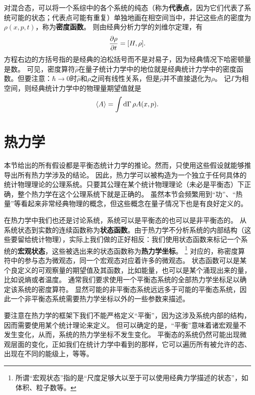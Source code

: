 \documentclass[hyperref, UTF8, a4paper]{ctexart}
\begin{document}
对混合态，可以将一个系综中的各个系统的纯态（称为\textbf{代表点}，因为它们代表了系统可能的状态；代表点可能有重复）单独地画在相空间当中，并记这些点的密度为$\rho(x, p, t)$，称为\textbf{密度函数}。
则由经典分析力学的刘维尔定理，有
\begin{equation}
    \pdv{\rho}{t} = [H, \rho].
\end{equation}
方程右边的方括号指的是经典的泊松括号而不是对易子，因为经典情况下哈密顿量是数。
可见，密度算符$\hat{\rho}$在量子统计力学中的地位就是经典统计力学中的密度函数。但要注意：$\hbar\to 0$时$\hat{\rho}$和$\rho$之间有线性关系，但是$\hat{\rho}$并不直接退化为$\rho$。
记$\Gamma$为相空间，则经典统计力学中的物理量期望值就是
\begin{equation}
    \expval{A} = \int \dd{\Gamma} \rho A(x, p).
\end{equation}

\section{热力学}

本节给出的所有假设都是平衡态统计力学的推论。然而，只使用这些假设就能够推导出所有热力学涉及的结论。
因此，热力学可以被构造为一个独立于任何具体的统计物理理论的公理系统。只要其公理在某个统计物理理论（未必是平衡态）下正确，整个热力学在这个公理系统下就是正确的。
虽然本节会频繁用到“功”、“热量”等看起来非常经典物理的概念，但这些概念在量子情况下也是有良好定义的。

在热力学中我们也还是讨论系统，系统可以是平衡态的也可以是非平衡态的。
从系统状态到实数的连续函数称为\textbf{状态函数}。由于热力学不分析系统的内部结构（这些要留给统计物理），实际上我们做的正好相反：我们使用状态函数来标记一个系统的\textbf{宏观状态}，这些被选出来的状态函数称为\textbf{热力学坐标}。%
\footnote{所谓“宏观状态”指的是“尺度足够大以至于可以使用经典力学描述的状态”，如体积、粒子数等。}%
对应的，称密度算符中的参与态为微观态，同一个宏观态对应着许多的微观态。
状态函数可以是某个良定义的可观察量的期望值及其函数，比如能量，也可以是某个涌现出来的量，比如说熵或者温度。
通常我们要求使用一个平衡态系统的全部热力学坐标足以确定该系统的密度算符。
显然可能的非平衡态系统远远多于可能的平衡态系统，因此一个非平衡态系统需要热力学坐标以外的一些参数来描述。

要注意在热力学的框架下我们不能严格定义“平衡”，因为这涉及系统内部的结构，因而需要使用某个统计理论来定义。
但可以确定的是，“平衡”意味着诸宏观量不发生变化，从而，系统的热力学坐标不发生变化。
平衡态的系统仍然可能出现微观层面的变化，正如我们在统计力学中看到的那样，它可以遍历所有被允许的态、出现在不同的能级上，等等。
\end{document}
